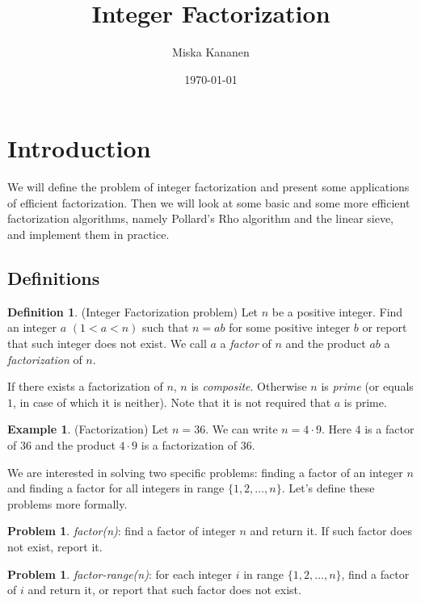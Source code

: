 \documentclass[12pt] {article}
\theoremstyle{plain}
\theoremstyle{definition}
\newtheorem{defn}[thm]{Definition}
\newtheorem{exmp}[thm]{Example}
\newtheorem{prob}[thm]{Problem}
\begin{document}
\title {Integer Factorization}
\author {Miska Kananen}
\date {\today}
\maketitle

\tableofcontents

\section {Introduction}

We will define the problem of integer factorization and present some applications of efficient factorization. Then we will look at some basic and some more efficient factorization algorithms, namely Pollard's Rho algorithm and the linear sieve, and implement them in practice.

\subsection {Definitions}

\begin{defn} (Integer Factorization problem)
Let $n$ be a positive integer. Find an integer $a$ $(1 < a < n)$ such that $n = ab$ for some positive integer $b$ or report that such integer does not exist. We call $a$ a \textit{factor} of $n$ and the product $ab$ a \textit{factorization} of $n$.
\end{defn}

If there exists a factorization of $n$, $n$ is \textit{composite}. Otherwise $n$ is \textit{prime} (or equals $1$, in case of which it is neither). Note that it is not required that $a$ is prime.

\begin{exmp} (Factorization)
Let $n = 36$. We can write $n = 4 \cdot 9$. Here $4$ is a factor of $36$ and the product $4 \cdot 9$ is a factorization of $36$.
\end{exmp}

We are interested in solving two specific problems: finding a factor of an integer $n$ and finding a factor for all integers in range $\{1, 2, \dots, n\}$. Let's define these problems more formally.

\begin{prob}
\textit{factor(n)}: find a factor of integer $n$ and return it. If such factor does not exist, report it.
\end{prob}

\begin{prob}
\textit{factor-range(n)}: for each integer $i$ in range $\{1, 2, \dots, n\}$, find a factor of $i$ and return it, or report that such factor does not exist.
\end{prob}
\end{document}
